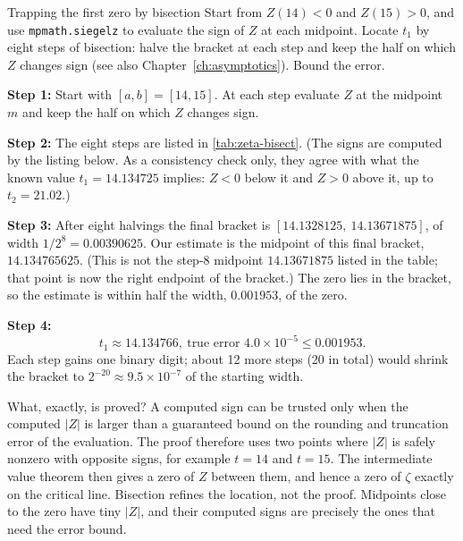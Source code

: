 \begin{sample}{Trapping the first zero by bisection}
Start from $Z(14)<0$ and $Z(15)>0$, and use \texttt{mpmath.siegelz} to evaluate the sign of $Z$ at each midpoint. Locate $t_1$ by eight steps of bisection: halve the bracket at each step and keep the half on which $Z$ changes sign (see also Chapter~\ref{ch:asymptotics}). Bound the error.

\textbf{Step 1:} Start with $[a,b]=[14,15]$. At each step evaluate $Z$ at the midpoint $m$ and keep the half on which $Z$ changes sign.

\textbf{Step 2:} The eight steps are listed in \cref{tab:zeta-bisect}. (The signs are computed by the listing below. As a consistency check only, they agree with what the known value $t_1=14.134725$ implies: $Z<0$ below it and $Z>0$ above it, up to $t_2=21.02$.)

\textbf{Step 3:} After eight halvings the final bracket is $[14.1328125,\ 14.13671875]$, of width $1/2^8=0.00390625$. Our estimate is the midpoint of this final bracket, $14.134765625$. (This is not the step-8 midpoint $14.13671875$ listed in the table; that point is now the right endpoint of the bracket.) The zero lies in the bracket, so the estimate is within half the width, $0.001953$, of the zero.

\textbf{Step 4:}
\[
\boxed{t_1\approx14.134766,\ \text{true error }4.0\times10^{-5}\le0.001953.}
\]
Each step gains one binary digit; about 12 more steps (20 in total) would shrink the bracket to $2^{-20}\approx9.5\times10^{-7}$ of the starting width.

What, exactly, is proved? A computed sign can be trusted only when the computed $|Z|$ is larger than a guaranteed bound on the rounding and truncation error of the evaluation. The proof therefore uses two points where $|Z|$ is safely nonzero with opposite signs, for example $t=14$ and $t=15$. The intermediate value theorem then gives a zero of $Z$ between them, and hence a zero of $\zeta$ exactly on the critical line. Bisection refines the location, not the proof. Midpoints close to the zero have tiny $|Z|$, and their computed signs are precisely the ones that need the error bound.
\end{sample}

